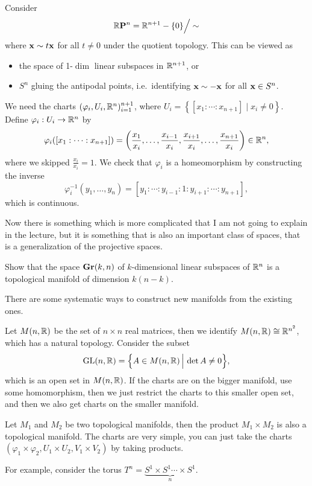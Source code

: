 \begin{example}
  Consider \[
    \mathbb{R}\mathbf{P}^n = \mathbb{R}^{n+1}\mathbin{-}\{0\}\Big/\sim
  \] where \(\mathbf{x}\sim t\mathbf{x}\) for all \(t\neq 0\) under the quotient topology.
  This can be viewed as \begin{itemize}
    \item the space of 1-\(\dim\) linear subspaces in \(\mathbb{R}^{n+1}\), or
    \item \(S^n\) gluing the antipodal points, i.e.\ identifying \(\mathbf{x}\sim -\mathbf{x}\) for all \(\mathbf{x}\in S^n\).
  \end{itemize}

  We need the charts \((\varphi_i,U_i,\mathbb{R}^n)_{i=1}^{n+1}\), where \(U_i = \left\{[x_1:\cdots:x_{n+1}]\mid x_i\neq 0\right\}\). Define \(\varphi_i:U_i\to\mathbb{R}^n\) by \[
    \varphi_i([x_1:\cdots:x_{n+1}]) = \left(\frac{x_1}{x_i},\ldots,\frac{x_{i-1}}{x_i},\frac{x_{i+1}}{x_i},\ldots,\frac{x_{n+1}}{x_i}\right)\in\mathbb{R}^n,
  \] where we skipped \(\frac{x_i}{x_i} = 1\).
  We check that \(\varphi_i\) is a homeomorphism by constructing the inverse \[
    \varphi_i^{-1}(y_1,\ldots,y_n) = [y_1:\cdots:y_{i-1}:1:y_{i+1}:\cdots:y_{n+1}],
  \] which is continuous.
\end{example}

Now there is something which is more complicated that I am not going to explain in the lecture, but it is something that is also an important class of spaces, that is a generalization of the projective spaces.
\begin{homework}[Grassmanians \(\Gr(k,n)\)]
  Show that the space \(\Gr(k,n)\) of \(k\)-dimensional linear subspaces of \(\mathbb{R}^n\) is a topological manifold of dimension \(k(n-k)\).
\end{homework}

There are some systematic ways to construct new manifolds from the existing ones.
\begin{example}
  Let \(M(n,\mathbb{R})\) be the set of \(n\times n\) real matrices, then we identify \(M(n,\mathbb{R})\cong\mathbb{R}^{n^2}\), which has a natural topology. Consider the subset \[
    \mathrm{GL}(n,\mathbb{R}) = \Big\{A\in M(n,\mathbb{R})\,\Big|\,\det A\neq 0\Big\},
  \] which is an open set in \(M(n,\mathbb{R})\). If the charts are on the bigger manifold, use some homomorphism, then we just restrict the charts to this smaller open set, and then we also get charts on the smaller manifold.
\end{example}

\begin{example}
  Let \(M_1\) and \(M_2\) be two topological manifolds, then the product \(M_1\times M_2\) is also a topological manifold. The charts are very simple, you can just take the charts \((\varphi_1\times\varphi_2,U_1\times U_2, V_1\times V_2)\) by taking products.

  For example, consider the torus \(T^n = \underbrace{S^1\times S^1\cdots\times S^1}_n\).
\end{example}

